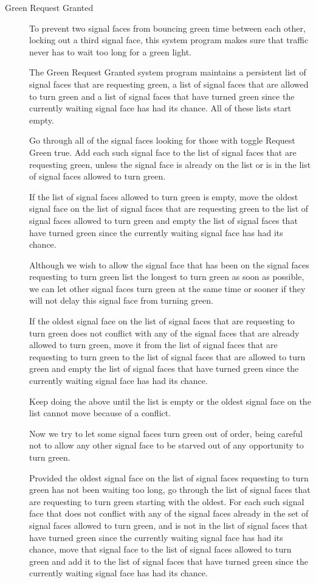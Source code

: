 \documentclass[letterpaper,twoside]{article}
\begin{document}
\begin{description}
\item [Green Request Granted]

To prevent two signal faces from bouncing green time between each other,
locking out a third signal face, this system program makes sure that
traffic never has to wait too long for a green light.

The Green Request Granted system program maintains a persistent list of
signal faces that are requesting green,
a list of signal faces that are allowed to turn green and a list of signal
faces that have turned green since the currently waiting signal face
has had its chance.
All of these lists start empty.

Go through all of the signal faces looking for those with toggle Request
Green true.  Add each such signal face to the list of
signal faces that are requesting green, unless the signal face is already on
the list or is in the list of signal faces allowed to turn green.

If the list of signal faces allowed to turn green is empty, move the
oldest signal face on the list of signal faces that are requesting
green to the list of signal faces allowed to turn green and empty the list
of signal faces that have turned green since the currently waiting
signal face has had its chance.

Although we wish to allow the signal face that has been on the
signal faces requesting to turn green list the longest to turn green
as soon as possible, we can let other signal faces turn green
at the same time or sooner if they will not delay this signal face
from turning green.

If the oldest signal face on the list of signal faces that are
requesting to turn green does not conflict with any of the signal
faces that are already allowed to turn green, move it from the
list of signal faces that are requesting to turn green to the list
of signal faces that are allowed to turn green and empty the list
of signal faces that have turned green since the currently waiting
signal face has had its chance.

Keep doing the above until the list is empty or the oldest signal
face on the list cannot move because of a conflict.

Now we try to let some signal faces turn green out of order, being
careful not to allow any other signal face to be starved out of any
opportunity to turn green.

Provided the oldest signal face on the list of signal faces
requesting to turn green has not been waiting too long,
go through the list of signal faces that are requesting to turn green
starting with the oldest.  For each such signal face that does not
conflict with any of the signal faces already in the set of signal
faces allowed to turn green, and is not in the list of signal faces
that have turned green since the currently waiting signal face has
had its chance, move that signal face to the list of signal faces
allowed to turn green and add it to the list of signal faces that have
turned green since the currently waiting signal face has had its
chance.


\end{description}
\end{document}

